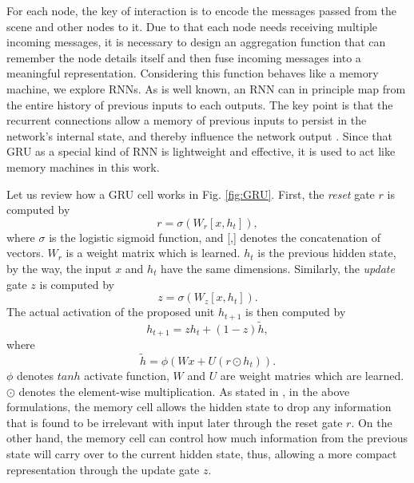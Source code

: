 \documentclass[10pt,twocolumn,letterpaper]{article}
\begin{document}
For each node, the key of interaction is to encode the messages passed from the scene and other nodes to it. Due to that each node needs receiving multiple incoming messages, it is necessary to design an aggregation function that can remember the node details itself and then fuse incoming messages into a meaningful representation. Considering this function behaves like a memory machine, we explore RNNs. As is well known, an RNN can in principle map from the entire history of previous inputs to each outputs. The key point is that the recurrent connections allow a memory of previous inputs to persist in the network's internal state, and thereby influence the network output \cite{Book}. Since that GRU\cite{GRU} as a special kind of RNN is lightweight and effective, it is used to act like memory machines in this work.

Let us review how a GRU cell works in Fig. \ref{fig:GRU}. First, the \emph{reset} gate $r$ is computed by
\begin{equation}
r = \sigma(W_r[x, h_{t}]) ,
\end{equation}
where $\sigma$ is the logistic sigmoid function, and [,] denotes the concatenation of vectors. $W_r$ is a weight matrix which is learned. $h_t$ is the previous hidden state, by the way, the input $x$ and $h_t$ have the same dimensions. 
Similarly, the \emph{update} gate $z$ is computed by
\begin{equation}
z = \sigma(W_z[x, h_{t}]) .
\end{equation}
The actual activation of the proposed unit $h_{t+1}$ is then computed by
\begin{equation}
h_{t+1} = zh_t + (1-z)\tilde{h} ,
\end{equation}
where
\begin{equation}
\tilde{h}=\phi(Wx + U(r\odot h_t)) .
\end{equation}
$\phi$ denotes $tanh$ activate function, $W$ and $U$ are weight matries which are learned. $\odot$ denotes the element-wise multiplication. As stated in \cite{GRU}, in the above formulations, the memory cell allows the hidden state to drop any information that is found to be irrelevant with input later through the reset gate $r$. On the other hand, the memory cell can control how much information from the previous state will carry over to the current hidden state, thus, allowing a more compact representation through the update gate $z$. 
\end{document}
